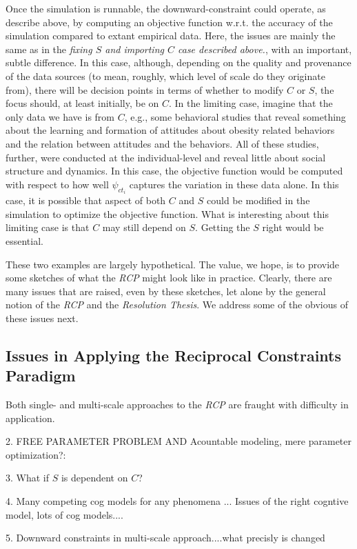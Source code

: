 \documentclass{article}
\begin{document}
Once the simulation is runnable, the downward-constraint could operate, as describe above, by computing an objective function w.r.t. the accuracy of the simulation compared to extant empirical data.  Here, the issues are mainly the same as in the \textit{fixing $S$ and importing $C$ case described above.}, with an important, subtle difference.  In this case, although, depending on the quality and provenance of the data sources (to mean, roughly, which level of scale do they originate from), there will be decision points in terms of whether to modify $C$ or $S$, the focus should, at least initially, be on $C$.  In the limiting case, imagine that the only data we have is from $C$, e.g., some behavioral studies that reveal something about the learning and formation of attitudes about obesity related behaviors and the relation between attitudes and the behaviors.  All of these studies, further, were conducted at the individual-level and reveal little about social structure and dynamics.  In this case, the objective function would be computed with respect to how well $\psi_{ct_i}$ captures the variation in these data alone.  In this case, it is possible that aspect of both $C$ and $S$ could be modified in the simulation to optimize the objective function.  What is interesting about this limiting case is that $C$ may still depend on $S$.  Getting the $S$ right would be essential.    

These two examples are largely hypothetical.  The value, we hope, is to provide some sketches of what the \textit{RCP} might look like in practice.  Clearly, there are many issues that are raised, even by these sketches, let alone by the general notion of the \textit{RCP} and the \textit{Resolution Thesis}.  We address some of the obvious of these issues next.

\subsection{Issues in Applying the Reciprocal Constraints Paradigm }
Both single- and multi-scale approaches to the \textit{RCP} are fraught with difficulty in application.  

2. FREE PARAMETER PROBLEM AND Acountable modeling, mere parameter optimization?: 

3. What if $S$ is dependent on $C$?

4. Many competing cog models for any phenomena ... Issues of the right cogntive model, lots of cog models....

5. Downward constraints in multi-scale approach....what precisly is changed
\end{document}
